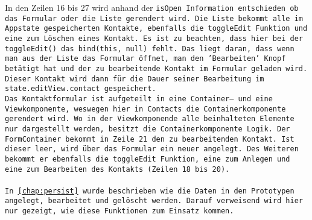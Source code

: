 In den Zeilen 16 bis 27 wird anhand der \tt{isOpen} Information entschieden ob das Formular oder die Liste gerendert wird.
Die Liste bekommt alle im \gls{App}state gespeicherten Kontakte, ebenfalls die \tt{toggleEdit} Funktion und eine zum Löschen eines Kontakt. Es ist zu beachten, dass hier bei der \tt{toggleEdit()} das \tt{bind(this, null)} fehlt. Das liegt daran, dass wenn man aus der Liste das Formular öffnet, man den 'Bearbeiten' Knopf betätigt hat und der zu bearbeitende Kontakt im Formular geladen wird. Dieser Kontakt wird dann für die Dauer seiner Bearbeitung im \tt{state.editView.contact} gespeichert.\\
Das Kontaktformular ist aufgeteilt in eine Container-- und eine Viewkomponente, weswegen hier in \tt{Contacts} die Containerkomponente gerendert wird.
Wo in der Viewkomponende alle beinhalteten Elemente nur dargestellt werden, besitzt die Containerkomponente Logik.
Der \tt{FormContainer} bekommt in Zeile 21 den zu bearbeitenden Kontakt.
Ist dieser leer, wird über das Formular ein neuer angelegt.
Des Weiteren bekommt er ebenfalls die \tt{toggleEdit} Funktion, eine zum Anlegen und eine zum Bearbeiten des Kontakts (Zeilen 18 bis 20).\\\\
%
%
In \autoref{chap:persist} wurde beschrieben wie die Daten in den Prototypen angelegt, bearbeitet und gelöscht werden. Darauf verweisend wird hier nur gezeigt, wie diese Funktionen zum Einsatz kommen.